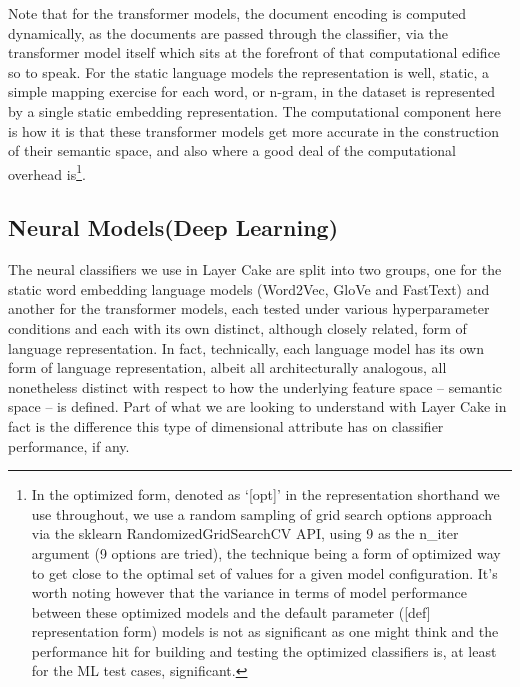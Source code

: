 \documentclass[final]{clv2025}
\begin{document}
Note that for the transformer models, the document encoding is computed dynamically, as the documents are passed through the classifier, via the transformer model itself which sits at the forefront of that computational edifice so to speak. For the static language models the representation is well, static, a simple mapping exercise for each word, or n-gram, in the dataset is represented by a single static embedding representation. The computational component here is how it is that these transformer models get more accurate in the construction of their semantic space, and also where a good deal of the computational overhead is\footnote{ In the optimized form, denoted as ‘[opt]’ in the representation shorthand we use throughout, we use a random sampling of grid search options approach via the sklearn RandomizedGridSearchCV API, using 9 as the n\_iter argument (9 options are tried), the technique being a form of optimized way to get close to the optimal set of values for a given model configuration. It’s worth noting however that the variance in terms of model performance between these optimized models and the default parameter ([def] representation form) models is not as significant as one might think and the performance hit for building and testing the optimized classifiers is, at least for the ML test cases, significant.}. 

\subsection{Neural Models(Deep Learning)}
The neural classifiers we use in Layer Cake are split into two groups, one for the static word embedding language models (Word2Vec, GloVe and FastText) and another for the transformer models, each tested under various hyperparameter conditions and each with its own distinct, although closely related, form of language representation. In fact, technically, each language model has its own form of language representation, albeit all architecturally analogous, all nonetheless distinct with respect to how the underlying feature space – semantic space – is defined. Part of what we are looking to understand with Layer Cake in fact is the difference this type of dimensional attribute has on classifier performance, if any.
\end{document}
